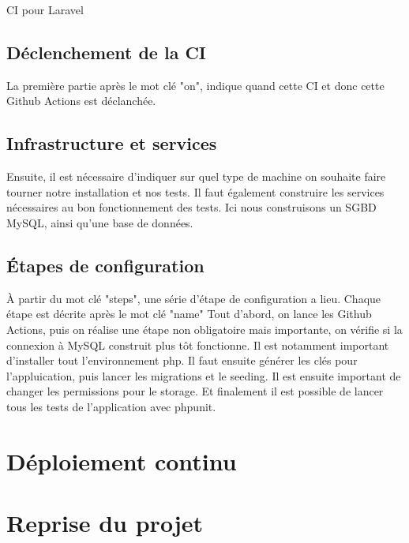 \documentclass[
    iai, %
    il, %
]{heig-tb}
\begin{document}
\begin{listing}[h]
    \inputminted{yml}{assets/code/ci.yml}
    \caption{CI pour Laravel \label{ci}}
\end{listing}

\section{Déclenchement de la CI}
La première partie après le mot clé "on", indique quand cette CI et donc cette Github Actions est
déclanchée.\newline

\section{Infrastructure et services}
Ensuite, il est nécessaire d'indiquer sur quel type de machine on souhaite faire tourner notre
installation et nos tests. Il faut également construire les services nécessaires au bon
fonctionnement des tests. Ici nous construisons un SGBD MySQL, ainsi qu'une base de données.\newline

\section{Étapes de configuration}

À partir du mot clé "steps", une série d'étape de configuration a lieu.\newline
Chaque étape est décrite après le mot clé "name"\newline
Tout d'abord, on lance les Github Actions, puis on réalise une étape non obligatoire mais
importante, on vérifie si la connexion à MySQL construit plus tôt fonctionne.\newline
Il est notamment important d'installer tout l'environnement php.\newline
Il faut ensuite générer les clés pour l'appluication, puis lancer les migrations et le
seeding.\newline
Il est ensuite important de changer les permissions pour le storage. Et finalement il est possible
de lancer tous les tests de l'application avec phpunit.

\chapter{Déploiement continu}

\chapter{Reprise du projet}
\end{document}
